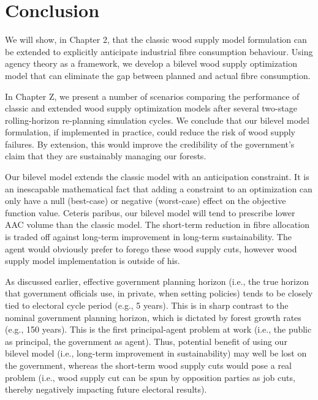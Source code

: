 \setcounter{secnumdepth}{0} 

\chapter*{Conclusion}



We will show, in Chapter 2, that the classic wood supply model formulation can be extended to explicitly anticipate industrial fibre consumption behaviour. Using agency theory as a framework, we develop a bilevel wood supply optimization model that can eliminate the gap between planned and actual fibre consumption. 

In Chapter Z, we present a number of scenarios comparing the performance of classic and extended wood supply optimization models after several two-stage rolling-horizon re-planning simulation cycles. We conclude that our bilevel model formulation, if implemented in practice, could reduce the risk of wood supply failures. By extension, this would improve the credibility of the government's claim that they are sustainably managing our forests.

Our bilevel model extends the classic model with an anticipation constraint. It is an inescapable mathematical fact that adding a constraint to an optimization can only have a null (best-case) or negative (worst-case) effect on the objective function value. Ceteris paribus, our bilevel model will tend to prescribe lower AAC volume than the classic model. The short-term reduction in fibre allocation is traded off against long-term improvement in long-term sustainability. The agent would obviously prefer to forego these wood supply cuts, however wood supply model implementation is outside of his. 

As discussed earlier, effective government planning horizon (i.e., the true horizon that government officials use, in private, when setting policies) tends to be closely tied to electoral cycle period (e.g., 5 years). This is in sharp contrast to the nominal government planning horizon, which is dictated by forest growth rates (e.g., 150 years). This is the first principal-agent problem at work (i.e., the public as principal, the government as agent). Thus, potential benefit of using our bilevel model (i.e., long-term improvement in sustainability) may well be lost on the government, whereas the short-term wood supply cuts would pose a real problem (i.e., wood supply cut can be spun by opposition parties as job cuts, thereby negatively impacting future electoral results). 

